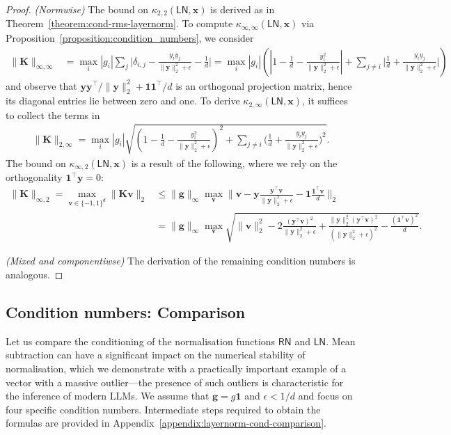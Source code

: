 \documentclass[namedate,webpdf,imanum]{ima-authoring-template}
\newcommand{\Matrix}[1]{\mathbf{#1}}
\newcommand{\trans}{\intercal}
\newcommand{\Norm}[3][]{#1\| #2 #1\|_{\mathrm{#3}}}
\newcommand{\One}{\Matrix{1}}
\newcommand{\Layer}[1]{\mathsf{#1}}
\newcommand{\cond}[3][]{\kappa_{\mathrm{#2}} #1( #3 #1)}
\numberwithin{equation}{section}
\begin{document}
\begin{proof}
\emph{(Normwise)}
The bound on $\cond{2,2}{\Layer{LN}, \Matrix{x}}$ is derived as in Theorem~\ref{theorem:cond-rms-layernorm}.
To compute $\cond{\infty,\infty}{\Layer{LN}, \Matrix{x}}$ via Proposition~\ref{proposition:condition_numbers}, we consider
\begin{align*}
    \Norm{\Matrix{K}}{\infty,\infty} &= \max_{i} |g_i| \sum_{j} \bigg|\delta_{i,j} - \frac{y_i y_j}{\Norm{\Matrix{y}}{2}^2 + \epsilon} - \frac{1}{d} \bigg| = \max_{i} |g_i| \left( \left| 1 - \frac{1}{d} - \frac{y_i^2}{\Norm{\Matrix{y}}{2}^2 + \epsilon} \right| + \sum_{j \neq i} \bigg|\frac{1}{d} + \frac{y_i y_j}{\Norm{\Matrix{y}}{2}^2 + \epsilon} \bigg| \right)
\end{align*}
and observe that $\Matrix{y} \Matrix{y}^\trans / \Norm{\Matrix{y}}{2}^2 + \One \One^\trans / d$ is an orthogonal projection matrix, hence its diagonal entries lie between zero and one.
To derive $\cond{2,\infty}{\Layer{LN}, \Matrix{x}}$, it suffices to collect the terms in
\begin{align*}
    \Norm{\Matrix{K}}{2,\infty} = \max_{i} |g_i| \sqrt{\left( 1 - \frac{1}{d} - \frac{y_i^2}{\Norm{\Matrix{y}}{2}^2 + \epsilon} \right)^2 + \sum_{j \neq i} \bigg(\frac{1}{d} + \frac{y_i y_j}{\Norm{\Matrix{y}}{2}^2 + \epsilon} \bigg)^2}.
\end{align*}
The bound on $\cond{\infty,2}{\Layer{LN}, \Matrix{x}}$ is a result of the following, where we rely on the orthogonality $\One^\trans \Matrix{y} = 0$:
\begin{align*}
    \Norm{\Matrix{K}}{\infty,2} = \max_{\Matrix{v} \in \{ -1,1 \}^d} \Norm{\Matrix{K} \Matrix{v}}{2} &\leq \Norm{\Matrix{g}}{\infty} \max_{\Matrix{v}} \Norm[\bigg]{\Matrix{v} - \Matrix{y} \frac{\Matrix{y}^\trans \Matrix{v}}{\Norm{\Matrix{y}}{2}^2 + \epsilon} - \One \frac{\One^\trans \Matrix{v}}{d}}{2} \\
    &= \Norm{\Matrix{g}}{\infty} \max_{\Matrix{v}} \sqrt{\Norm{\Matrix{v}}{2}^2 - 2 \frac{(\Matrix{y}^\trans \Matrix{v})^2}{\Norm{\Matrix{y}}{2}^2 + \epsilon} + \frac{\Norm{\Matrix{y}}{2}^2 (\Matrix{y}^\trans \Matrix{v})^2}{(\Norm{\Matrix{y}}{2}^2 + \epsilon)^2} - \frac{(\One^\trans \Matrix{v})^2}{d}}.
\end{align*}

\emph{(Mixed and componentiwse)}
The derivation of the remaining condition numbers is analogous.
\end{proof}

\subsection{Condition numbers: Comparison}
\label{subsec:layernorm_comparison}
Let us compare the conditioning of the normalisation functions $\Layer{RN}$ and $\Layer{LN}$.
Mean subtraction can have a significant impact on the numerical stability of normalisation, which we demonstrate with a practically important example of a vector with a massive outlier---the presence of such outliers is characteristic for the inference of modern LLMs.
We assume that $\Matrix{g} = g\One$ and $\epsilon < 1/d$ and focus on four specific condition numbers.
Intermediate steps required to obtain the formulas are provided in Appendix~\ref{appendix:layernorm-cond-comparison}.
\end{document}
